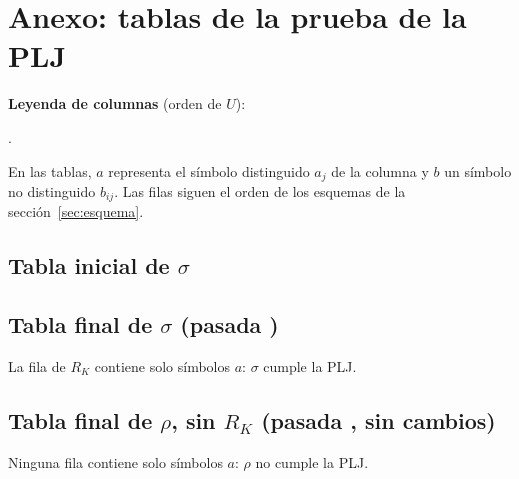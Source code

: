 \documentclass[11pt,a4paper]{article}
\begin{document}
\appendix
\section{Anexo: tablas de la prueba de la PLJ}\label{anexo:plj}

\textbf{Leyenda de columnas} (orden de $U$): {\small\raggedright \leyendaU.\par}

En las tablas, $a$ representa el símbolo distinguido $a_j$ de la columna y $b$ un símbolo no distinguido $b_{ij}$. Las filas siguen el orden de los esquemas de la sección~\ref{sec:esquema}.

\begin{landscape}
\subsection*{Tabla inicial de $\sigma$}
{\scriptsize\centering \matrizinicial\par}

\subsection*{Tabla final de $\sigma$ (pasada \numpasadas)}
{\scriptsize\centering \matrizfinal\par}
La fila de $R_K$ contiene solo símbolos $a$: $\sigma$ cumple la PLJ.

\newpage
\subsection*{Tabla final de $\rho$, sin $R_K$ (pasada \numpasadassinRK, sin cambios)}
{\scriptsize\centering \matrizsinRK\par}
Ninguna fila contiene solo símbolos $a$: $\rho$ no cumple la PLJ.
\end{landscape}
\end{document}

